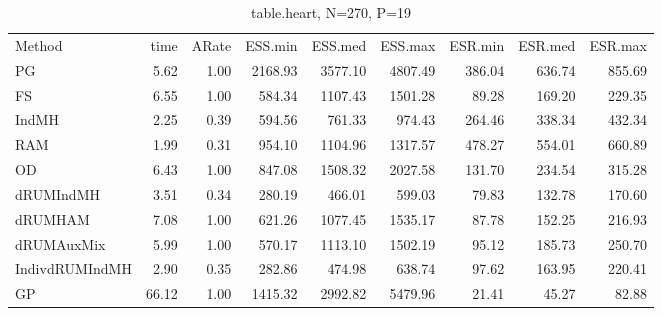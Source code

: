 \begin{table}
\begin{tabular}{l r r r r r r r r } 
          Method  &     time &    ARate &  ESS.min &  ESS.med &  ESS.max &  ESR.min &  ESR.med &  ESR.max \\ 
              PG  &     5.62 &     1.00 &  2168.93 &  3577.10 &  4807.49 &   386.04 &   636.74 &   855.69 \\ 
              FS  &     6.55 &     1.00 &   584.34 &  1107.43 &  1501.28 &    89.28 &   169.20 &   229.35 \\ 
           IndMH  &     2.25 &     0.39 &   594.56 &   761.33 &   974.43 &   264.46 &   338.34 &   432.34 \\ 
             RAM  &     1.99 &     0.31 &   954.10 &  1104.96 &  1317.57 &   478.27 &   554.01 &   660.89 \\ 
              OD  &     6.43 &     1.00 &   847.08 &  1508.32 &  2027.58 &   131.70 &   234.54 &   315.28 \\ 
       dRUMIndMH  &     3.51 &     0.34 &   280.19 &   466.01 &   599.03 &    79.83 &   132.78 &   170.60 \\ 
         dRUMHAM  &     7.08 &     1.00 &   621.26 &  1077.45 &  1535.17 &    87.78 &   152.25 &   216.93 \\ 
      dRUMAuxMix  &     5.99 &     1.00 &   570.17 &  1113.10 &  1502.19 &    95.12 &   185.73 &   250.70 \\ 
  IndivdRUMIndMH  &     2.90 &     0.35 &   282.86 &   474.98 &   638.74 &    97.62 &   163.95 &   220.41 \\ 
              GP  &    66.12 &     1.00 &  1415.32 &  2992.82 &  5479.96 &    21.41 &    45.27 &    82.88
 \end{tabular}
\caption{table.heart, N=270, P=19}
\end{table}

